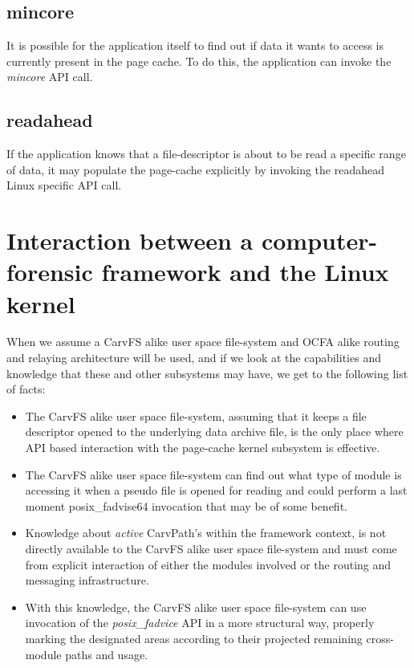 \subsection{mincore}
It is possible for the application itself to find out if data it wants to access is currently present in the page cache. To do this, the application can invoke the \emph{mincore} API call.  
\subsection{readahead}
If the application knows that a file-descriptor is about to be read a specific range of data, it may populate the page-cache explicitly by invoking the readahead Linux specific API call.
\section{Interaction between a computer-forensic framework and the Linux kernel}
When we assume a CarvFS alike user space file-system and OCFA alike routing and relaying architecture will be used, and if we look at the capabilities and knowledge that these and other subsystems may have, we get to the following list of facts:
\begin{itemize}
\item The CarvFS alike user space file-system, assuming that it keeps a file descriptor opened to the underlying data archive file, is the only place where API based interaction with the page-cache kernel subsystem is effective.
\item The CarvFS alike user space file-system can find out what type of module is accessing it when a pseudo file is opened for reading and could perform a last moment posix\_fadvise64 invocation that may be of some benefit. 
\item Knowledge about \emph{active} CarvPath's within the framework context, is not directly available to the CarvFS alike user space file-system and must come from explicit interaction of either the modules involved or the routing and messaging infrastructure.
\item With this knowledge, the CarvFS alike user space file-system can use invocation of the \emph{posix\_fadvice} API in a more structural way, properly marking the designated areas according to their projected remaining cross-module paths and usage. 
\end{itemize} 
